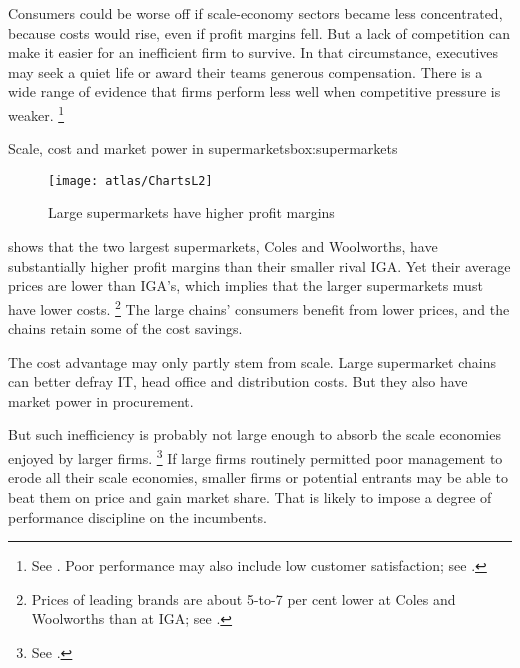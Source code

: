 Consumers could be worse off if scale-economy sectors became less concentrated, because costs would rise, even if profit margins fell.
But a lack of competition can make it easier for an inefficient firm to survive. In that circumstance, executives may seek a quiet life or award their teams generous compensation. There is a wide range of evidence that firms perform less well when competitive pressure is weaker.%
    \footnote{See \textcites{leibenstein1966allocative}{nickell1996competition}{joskow2007regulation}. Poor performance may also include low customer satisfaction; see \textcites{chen2014effect}{kimmelman2017communications}.}

\begin{smallbox}[H]{Scale, cost and market power in supermarkets}{box:supermarkets}

\begin{figure}[H]\vspace{-5pt}
    \caption{Large supermarkets have higher profit margins\label{fig:profit_margins_supermarket}}
    \texttt{[image: atlas/ChartsL2]} 
\end{figure}\vspace{-15pt}

 shows that the two largest supermarkets, Coles and Woolworths, have substantially higher profit margins than their smaller rival IGA\@.
Yet their average prices are lower than IGA's, which implies that the larger supermarkets must have lower costs.%
    \footnote{Prices of leading brands are about 5-to-7 per cent lower at Coles and Woolworths than at IGA\@;
    see \textcite{Choice-supermarket-want-to-spend-less}.}
The large chains' consumers benefit from lower prices, and the chains retain some of the cost savings.

The cost advantage may only partly stem from scale. Large supermarket chains can better defray IT, head office and distribution costs. But they also have market power in procurement.
\end{smallbox}

But such inefficiency is probably not large enough to absorb the scale economies enjoyed by larger firms.%
    \footnote{See \textcites{barros2008analysing}{yang2009small}{shamsuddin2012does}.}
If large firms routinely permitted poor management to erode all their scale economies, smaller firms or potential entrants may be able to beat them on price and gain market share. That is likely to impose a degree of performance discipline on the incumbents.

